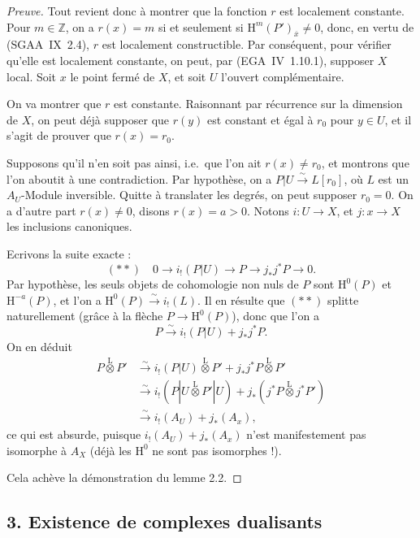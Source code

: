 \documentclass[11pt]{article}
\renewcommand{\H}{\mathrm{H}}
\newcommand{\Z}{\mathbb{Z}}
\newcommand{\ol}[1]{\overline{#1}}
\begin{document}
\begin{proof}[Preuve]
Tout revient donc à montrer que la fonction $r$ est localement constante. Pour $m \in \Z$, on a $r(x) = m$ si et seulement si $\H^{m}(P')_{\ol{x}} \neq 0$, donc, en vertu de (SGAA~IX~2.4), $r$ est localement constructible. Par conséquent, pour vérifier qu'elle est localement constante, on peut, par (EGA~IV~1.10.1), supposer $X$ local. Soit $x$ le point fermé de $X$, et soit $U$ l'ouvert complémentaire.

On va montrer que $r$ est constante. Raisonnant par récurrence sur la dimension de $X$, on peut déjà supposer que $r(y)$ est constant et égal à $r_0$ pour $y \in U$, et il s'agit de prouver que $r(x) = r_0$.

Supposons qu'il n'en soit pas ainsi, i.e.~que l'on ait $r(x) \neq r_0$, et montrons que l'on aboutit à une contradiction. Par hypothèse, on a $P|U \xrightarrow{\sim} L[r_0]$, où $L$ est un $A_U$-Module inversible. Quitte à translater les degrés, on peut supposer $r_0 = 0$. On a d'autre part $r(x) \neq 0$, disons $r(x) = a > 0$. Notons $i : U \to X$, et $j : x \to X$ les inclusions canoniques.

Ecrivons la suite exacte :
\[
(**) \quad 0 \longrightarrow i_{!}(P|U) \longrightarrow P \longrightarrow j_{*}j^{*}P \longrightarrow 0.
\]
Par hypothèse, les seuls objets de cohomologie non nuls de $P$ sont $\H^{0}(P)$ et $\H^{-a}(P)$, et l'on a $\H^{0}(P) \xrightarrow{\sim} i_{!}(L)$. Il en résulte que $(**)$ splitte naturellement (grâce à la flèche $P \to \H^{0}(P)$), donc que l'on a
\[
P \xrightarrow{\sim} i_{!}(P|U) + j_{*}j^{*}P.
\]
On en déduit
\begin{align*}
P \mathop{\otimes}\limits^{\mathrm{L}} P' &\xrightarrow{\sim} i_{!}(P|U) \mathop{\otimes}\limits^{\mathrm{L}} P' + j_{*}j^{*}P \mathop{\otimes}\limits^{\mathrm{L}} P' \\
&\xrightarrow{\sim} i_{!}(P|U \mathop{\otimes}\limits^{\mathrm{L}} P'|U) + j_{*}(j^{*}P \mathop{\otimes}\limits^{\mathrm{L}} j^{*}P') \\
&\xrightarrow{\sim} i_{!}(A_U) + j_{*}(A_x),
\end{align*}
ce qui est absurde, puisque $i_{!}(A_U) + j_{*}(A_x)$ n'est manifestement pas isomorphe à $A_X$ (déjà les $\H^{0}$ ne sont pas isomorphes !).

Cela achève la démonstration du lemme 2.2.
\end{proof}

\subsection{3. Existence de complexes dualisants}
\end{document}
